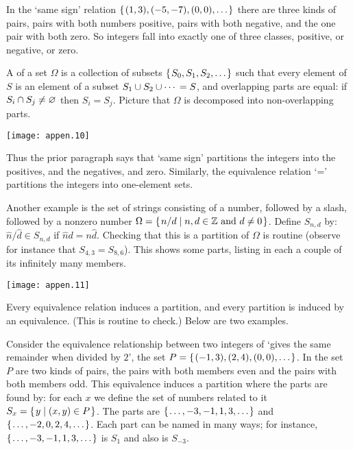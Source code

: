 In the `same sign' relation \( \mbox{$\{\hspace{0.1em} (1,3),(-5,-7),(0,0),\ldots\hspace{0.1em}\}$} \)
there are three kinds of pairs, pairs with both numbers positive,
pairs with both negative, and the one pair with both zero.
So integers fall into exactly one of three classes, positive, or negative,
or zero.

A  
of a set \( \Omega \) is a collection of subsets
\( \mbox{$\{\hspace{0.1em}S_0,S_1,S_2,\ldots\hspace{0.1em}\}$} \) such that
every element of \( S \) is an element of a subset
\( S_1\cup S_2\cup \cdots{} = S \), and overlapping parts are equal:
if \( S_i\cap S_j\neq\varnothing \) then $S_i=S_j$.
Picture that \( \Omega \) is decomposed into non-overlapping parts.
\begin{center}
  \texttt{[image: appen.10]}
\end{center}
Thus the prior paragraph says that `same sign' partitions
the integers into the positives, and the negatives, and zero.
Similarly, the equivalence relation `=' partitions the integers into
one-element sets.

Another example is the set of strings consisting of a number, followed
by a slash,
followed by a nonzero number
$\Omega=\mbox{$\{\hspace{0.1em}n/d\mid \text{$n,d\in\mathbb{Z}$ and $d\neq 0$}\hspace{0.1em}\}$}$.
Define $S_{n,d}$ by: $\hat{n}/\hat{d}\in S_{n,d}$ if 
$\hat{n}d=n\hat{d}$.
Checking that this is a partition of $\Omega$ is routine
(observe for instance that $S_{4,3}=S_{8,6}$).
This shows some parts, listing in each a couple of its infinitely many members. 
\begin{center}
  \texttt{[image: appen.11]}
\end{center}

Every equivalence relation induces a partition, and every 
partition is induced by an equivalence.
(This is routine to check.)
Below are two examples.
 
Consider the equivalence relationship between two integers of 
`gives the same remainder when divided by \( 2 \)',
the set \( P=\mbox{$\{\hspace{0.1em} (-1,3),(2,4),(0,0),\ldots\hspace{0.1em}\}$} \).
In the set $P$ are two kinds of pairs, the pairs with both members even
and the pairs with both members odd.
This equivalence induces a partition where the parts are found by: 
for each \( x \) we define the set of numbers related to
it \( S_x=\mbox{$\{\hspace{0.1em}y\mid (x,y)\in P\hspace{0.1em}\}$} \).
The parts are
\( \mbox{$\{\hspace{0.1em}\ldots,-3,-1,1,3,\ldots\hspace{0.1em}\}$} \) and
\( \mbox{$\{\hspace{0.1em}\ldots,-2,0,2,4,\ldots\hspace{0.1em}\}$} \).
Each part can be named in many ways; for instance,
\( \mbox{$\{\hspace{0.1em}\ldots,-3,-1,1,3,\ldots\hspace{0.1em}\}$} \) is \( S_1 \) and also is \( S_{-3} \).

